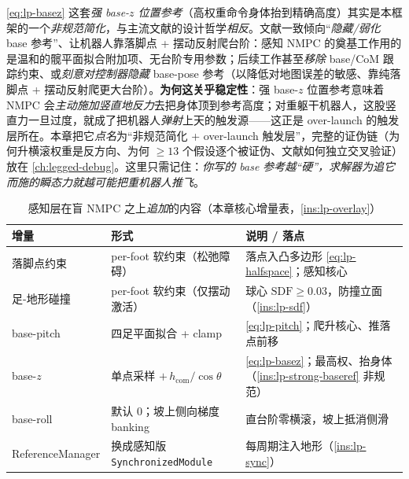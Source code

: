 \begin{insight}\label{ins:lp-strong-baseref}
\cref{eq:lp-basez} 这套\emph{强 base-$z$ 位置参考}（高权重命令身体抬到精确高度）其实是本框架的一个\emph{非规范简化}，与主流文献的设计哲学\emph{相反}。文献一致倾向“\emph{隐藏/弱化} base 参考”、让机器人靠落脚点 + 摆动反射爬台阶：感知 NMPC 的奠基工作\cite{grandia2022perceptive}用的是温和的髋平面拟合附加项、无台阶专用参数；后续工作甚至\emph{移除} base/CoM 跟踪约束、或\emph{刻意对控制器隐藏} base-pose 参考（以降低对地图误差的敏感、靠纯落脚点 + 摆动反射爬更大台阶）。\textbf{为何这关乎稳定性}：强 base-$z$ 位置参考意味着 NMPC 会\emph{主动施加竖直地反力}去把身体顶到参考高度；对重躯干机器人，这股竖直力一旦过度，就成了把机器人\emph{弹射}上天的触发源——这正是 over-launch 的触发层所在。本章把它\emph{点名}为“非规范简化 + over-launch 触发层”，完整的证伪链（为何升横滚权重是反方向、为何 $\ge 13$ 个假设逐个被证伪、文献如何独立交叉验证）放在 \cref{ch:legged-debug}。这里只需记住：\emph{你写的 base 参考越“硬”，求解器为追它而施的瞬态力就越可能把重机器人推飞}。
\end{insight}

\begin{table}[H]\centering\small
\caption{感知层在盲 NMPC 之上\emph{追加}的内容（本章核心增量表，\cref{ins:lp-overlay}）}
\begin{tabular}{p{} p{} p{}}
\toprule
增量 & 形式 & 说明 / 落点 \\
\midrule
落脚点约束 & per-foot 软约束（松弛障碍）& 落点入凸多边形 \cref{eq:lp-halfspace}；感知核心 \\
足-地形碰撞 & per-foot 软约束（仅摆动激活）& 球心 $\mathrm{SDF}\ge 0.03$，防撞立面（\cref{ins:lp-sdf}）\\
base-pitch & 四足平面拟合 + clamp & \cref{eq:lp-pitch}；爬升核心、推落点前移 \\
base-$z$ & 单点采样 $+\,h_{\mathrm{com}}/\cos\theta$ & \cref{eq:lp-basez}；最高权、抬身体（\cref{ins:lp-strong-baseref} 非规范）\\
base-roll & 默认 $0$；坡上侧向梯度 banking & 直台阶零横滚，坡上抵消侧滑 \\
ReferenceManager & 换成感知版 \texttt{SynchronizedModule} & 每周期注入地形（\cref{ins:lp-sync}）\\
\bottomrule
\end{tabular}
\label{tab:lp-increment}
\end{table}

